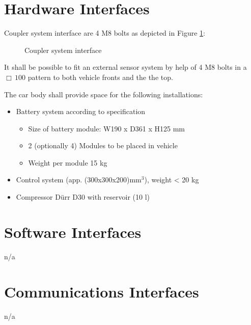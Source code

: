 \documentclass{scrreprt}
\begin{document}
\section{Hardware Interfaces}
Coupler system interface are 4 M8 bolts as depicted in Figure \ref{fig:coupler}:
\begin{figure}[htbp]
\begin{center}
\caption{Coupler system interface}
\label{fig:coupler}
\end{center}
\end{figure}

It shall be possible to fit an external sensor system by help of 4 M8 bolts in a $\Box \,100$ pattern to both vehicle fronts and the the top.

The car body shall provide space for the following installations:
\begin{itemize}
		\item Battery system according to specification
		\begin{itemize}
		\item Size of battery module: W190 x D361 x H125 mm
		\item 2 (optionally 4) Modules to be placed in vehicle
		\item Weight per module 15 kg
		\end{itemize}
		\item Control system (app. (300x300x200)mm$^3$), weight < 20 kg
		\item Compressor D\"urr D30 with reservoir (10 l)
\end{itemize}

\section{Software Interfaces}
n/a

\section{Communications Interfaces}
n/a
\end{document}
